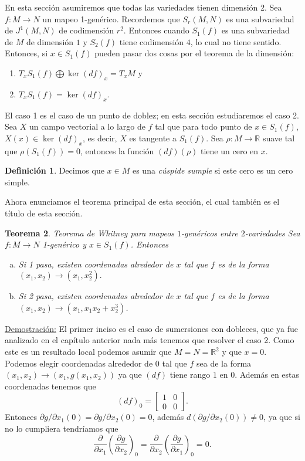 \documentclass{report}
\newtheorem{theorem}{Teorema}[section]
\theoremstyle{definition}
\newtheorem{defi}[theorem]{Definici\'on}
\begin{document}
En esta secci\'on asumiremos que todas las variedades tienen dimensi\'on 2. Sea $f:M \to N$ un mapeo 1-gen\'erico. Recordemos que $S_r (M,N)$ es una subvariedad de $J^1 (M,N)$ de codimensi\'on $r^2$. Entonces cuando $S_1 (f)$ es una subvariedad de $M$ de dimensi\'on $1$ y $S_2 (f)$ tiene codimensi\'on $4$, lo cual no tiene sentido. Entonces, si $x \in S_1 (f)$ pueden pasar dos cosas por el teorema de la dimensi\'on:
\begin{enumerate}
\item $T_x S_1 (f) \bigoplus \ker (df)_x = T_x M$ y
\item $T_x S_1 (f) = \ker(df)_x$.
\end{enumerate}

El caso 1 es el caso de un punto de doblez; en esta secci\'on estudiaremos el caso 2. Sea $X$ un campo vectorial a lo largo de $f$ tal que para todo punto de $x \in S_1(f)$, $X(x) \in \ker(df)_x$, es decir, $X$ es tangente a $S_1 (f)$. Sea $\rho: M \to \mathbb{R}$ suave tal que $\rho (S_1 (f)) = 0$, entonces la funci\'on $(df) (\rho)$ tiene un cero en $x$.

\begin{defi}
Decimos que $x \in M$ es una \textit{c\'uspide sumple} si este cero es un cero simple.
\end{defi}

Ahora enunciamos el teorema principal de esta secci\'on, el cual tambi\'en es el t\'itulo de esta secci\'on.

\begin{theorem}{Teorema de Whitney para mapeos $1$-gen\'ericos entre $2$-variedades}
Sea $f:M \to N$ 1-gen\'erico y $x \in S_1 (f)$. Entonces 
\begin{enumerate}[a.]
\item Si 1 pasa, existen coordenadas alrededor de $x$ tal que $f$ es de la forma $(x_1 , x_2 ) \to (x_1 , x_2^2) .$
\item Si 2 pasa, existen coordenadas alrededor de $x$ tal que $f$ es de la forma $(x_1, x_2) \to (x_1 , x_1 x_2 + x_2^3)$.
\end{enumerate}
\end{theorem}
\underline{Demostraci\'on:} El primer inciso es el caso de sumersiones con dobleces, que ya fue analizado en el cap\'itulo anterior nada m\'as tenemos que resolver el caso 2. Como este es un resultado local podemos asumir que $M = N = \mathbb{R}^2$ y que $x= 0$. Podemos elegir coordenadas alrededor de $0$ tal que $f$ sea de la forma $(x_1, x_2) \to (x_1, g(x_1, x_2))$ ya que $(df)$ tiene rango $1$ en $0$. Adem\'as en estas coordenadas tenemos que 
$$ (df)_0 =\begin{bmatrix}
1 & 0 \\
0 & 0
\end{bmatrix} .$$
Entonces $\partial g / \partial x_1 (0) = \partial g / \partial x_2 (0) = 0$, adem\'as $d( \partial g / \partial x_2 (0)) \neq 0$, ya que si no lo cumpliera tendr\'iamos que $$\frac{\partial}{\partial x_1} \left( \frac{\partial g}{\partial x_2}\right)_0 = \frac{\partial }{\partial x_2} \left( \frac{\partial g}{\partial x_1}\right)_0 = 0 .$$
\end{document}
